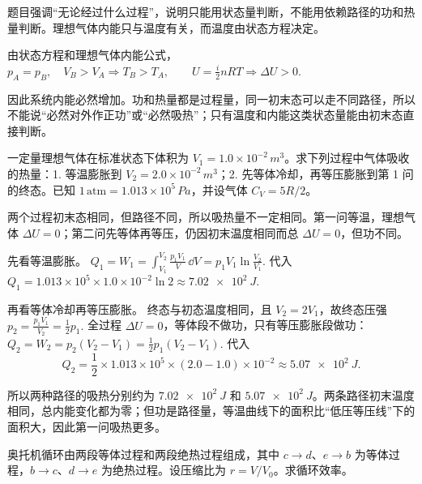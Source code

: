\documentclass[lang=cn,11pt]{elegantbook}
\begin{document}
\begin{solution}
题目强调“无论经过什么过程”，说明只能用状态量判断，不能用依赖路径的功和热量判断。理想气体内能只与温度有关，而温度由状态方程决定。

由状态方程和理想气体内能公式，
 \(p_A=p_B,\quad V_B>V_A \Longrightarrow T_B>T_A,\qquad U=\frac{i}{2}nRT \Longrightarrow \Delta U>0.\) 

因此系统内能必然增加。功和热量都是过程量，同一初末态可以走不同路径，所以不能说“必然对外作正功”或“必然吸热”；只有温度和内能这类状态量能由初末态直接判断。
\end{solution}

\begin{exercise}[标准状态理想气体两条路径到同一终态的吸热]
一定量理想气体在标准状态下体积为 \(V_1=1.0\times10^{-2}\,\si{m^3}\)。求下列过程中气体吸收的热量：1. 等温膨胀到 \(V_2=2.0\times10^{-2}\,\si{m^3}\)；2. 先等体冷却，再等压膨胀到第 1 问的终态。已知 \(1\,\mathrm{atm}=1.013\times10^5\,\si{Pa}\)，并设气体 \(C_V=5R/2\)。
\end{exercise}

\begin{solution}
两个过程初末态相同，但路径不同，所以吸热量不一定相同。第一问等温，理想气体 \(\Delta U=0\)；第二问先等体再等压，仍因初末温度相同而总 \(\Delta U=0\)，但功不同。

先看等温膨胀。
 \(Q_1=W_1=\int_{V_1}^{V_2}\frac{p_1V_1}{V}\,\dd V =p_1V_1\ln\frac{V_2}{V_1}.\) 
代入
 \(Q_1=1.013\times10^5\times1.0\times10^{-2}\ln2 \approx \SI{7.02e2}{J}.\) 

再看等体冷却再等压膨胀。 终态与初态温度相同，且 \(V_2=2V_1\)，故终态压强
 \(p_2=\frac{p_1V_1}{V_2}=\frac12p_1.\) 
全过程 \(\Delta U=0\)，等体段不做功，只有等压膨胀段做功：
 \(Q_2=W_2=p_2(V_2-V_1) =\frac12p_1(V_2-V_1).\) 
代入
\[
Q_2=\frac12\times1.013\times10^5\times(2.0-1.0)\times10^{-2}
\approx \SI{5.07e2}{J}.
\]

所以两种路径的吸热分别约为 \(\SI{7.02e2}{J}\) 和 \(\SI{5.07e2}{J}\)。两条路径初末温度相同，总内能变化都为零；但功是路径量，等温曲线下的面积比“低压等压线”下的面积大，因此第一问吸热更多。
\end{solution}

\begin{exercise}[奥托循环效率为什么自然写成压缩比的函数]
奥托机循环由两段等体过程和两段绝热过程组成，其中 \(c\to d\)、\(e\to b\) 为等体过程，\(b\to c\)、\(d\to e\) 为绝热过程。设压缩比为 \(r=V/V_0\)。求循环效率。
\end{exercise}
\end{document}
